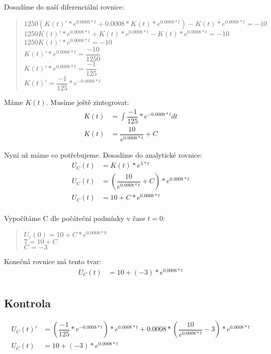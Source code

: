 Dosadíme do naší diferenciální rovnice: 
\begin{quote}
    \centering
    $1250(K(t)' * e^{0.0008 * t} + 0.0008 * K(t) * e^{0.0008 * t}) - K(t) * e^{0.0008 * t} = -10$ \\ 
    \medskip
    $1250K(t)' * e^{0.0008 * t} + K(t) * e^{0.0008 * t} - K(t) * e^{0.0008 * t} = -10$ \\
    \medskip
     $1250K(t)' * e^{0.0008 * t} = -10$ \\
     \medskip
     $K(t)' * e^{0.0008 * t} = \dfrac{-10}{1250}$  \\ 
     \medskip
     $K(t)' * e^{0.0008 * t} = \dfrac{-1}{125}$  \\ 
     \medskip
     $K(t)' = \dfrac{-1}{125} *  e^{-0.0008 * t}$  \\ 
\end{quote}

Máme $K(t)$. Musíme ještě zintegrovat:
\begin{align*}
	K(t) &= \int \dfrac{-1}{125} * e^{-0.0008 * t} dt \\
	K(t) &=\dfrac{10}{e^{0.0008 * t}} + C
\end{align*}


Nyní už máme co potřebujeme. Dosadíme do analytické rovnice:
\begin{align*}
		U_C(t) &= K(t) * e^{\lambda * t}\\
		U_C(t) &= (\dfrac{10}{e^{0.0008 * t}} + C) * e^{0.0008 * t}\\
		U_C(t) &= 10 + C * e^{0.0008 * t}\\
\end{align*}

Vypočítáme C dle počáteční podmínky v čase $t = 0$:
\begin{quote}
    \centering
    $U_c(0) = 10 + C * e^{0.0008 * 0}$ \\
	$7 = 10 + C$ \\
	$C = -3$
	
\end{quote}

Konečná rovnice má tento tvar:
\begin{align*}
	U_C(t) &= 10 + (-3) * e^{0.0008 * t}\\
\end{align*}

\subsection{Kontrola}
	
\begin{align*}
	U_C(t)' &= (\dfrac{-1}{125} * e^{-0.0008 * t} ) * e^{0.0008 * t} + 0.0008 * (\dfrac{10}{e^{0.0008 * t}} - 3) * e^{0.0008 * t} \\
	U_C(t) &= 10 + (-3) * e^{0.0008 * t}\\
\end{align*}

